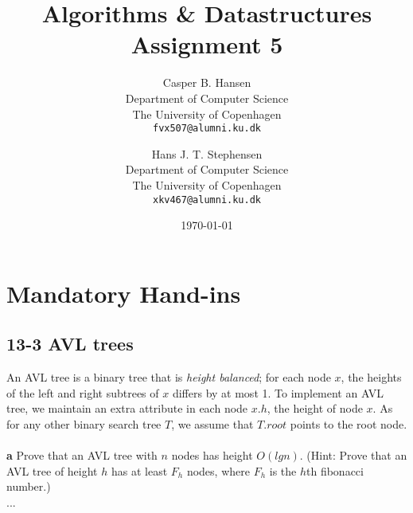 \documentclass[11pt,english]{article}
\title
{
	\vspace{1in}
	Algorithms \& Datastructures\\
	\huge Assignment 5
}
\author
{
	Casper B. Hansen\\
	\small Department of Computer Science\\
	\small The University of Copenhagen\\
	\texttt{fvx507@alumni.ku.dk}
	\and
	Hans J. T. Stephensen\\
	\small Department of Computer Science\\
	\small The University of Copenhagen\\
	\texttt{xkv467@alumni.ku.dk}
}
\date{\today}
\begin{document}
\clearpage
\maketitle
\thispagestyle{empty}


\newpage
\pagestyle{fancy}

\section*{Mandatory Hand-ins}

\subsection*{13-3 AVL trees}
\large{An AVL tree is a binary tree that is \textit{height balanced}; for each
node $x$, the heights of the left and right subtrees of $x$ differs by at most
1. To implement an AVL tree, we maintain an extra attribute in each node $x.h$,
the height of node $x$. As for any other binary search tree $T$, we assume
that $T.root$ points to the root node.}
\\\\
\noindent \large{\textbf{a} \mdseries Prove that an AVL tree with $n$ nodes
has height $O(lg n)$. (Hint: Prove that an AVL tree of height $h$ has at
least $F_h$ nodes, where $F_h$ is the $h$th fibonacci number.)}
\\
...







\end{document}
